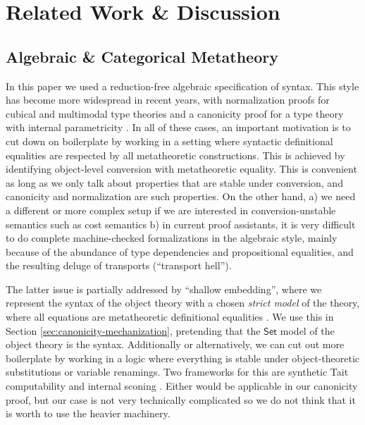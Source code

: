 \documentclass[acmsmall,screen,review]{acmart}
\newcommand{\msf}[1]{{\mathsf{#1}}}
\newcommand{\Set}{\msf{Set}}
\begin{document}
\section{Related Work \& Discussion}

\subsection{Algebraic \& Categorical Metatheory}

In this paper we used a reduction-free algebraic specification of syntax.  This style has become
more widespread in recent years, with normalization proofs for cubical \cite{ctt-normalization} and
multimodal type theories \cite{DBLP:conf/lics/Gratzer22} and a canonicity proof for a type theory
with internal parametricity \cite{altenkirch2024internal}. In all of these cases, an important
motivation is to cut down on boilerplate by working in a setting where syntactic definitional
equalities are respected by all metatheoretic constructions. This is achieved by identifying
object-level conversion with metatheoretic equality. This is convenient as long as we only talk
about properties that are stable under conversion, and canonicity and normalization are such
properties. On the other hand, a) we need a different or more complex setup if we are interested in
conversion-unstable semantics such as cost semantics b) in current proof assistants, it is very
difficult to do complete machine-checked formalizations in the algebraic style, mainly because of
the abundance of type dependencies and propositional equalities, and the resulting deluge of
transports (``transport hell'').

The latter issue is partially addressed by ``shallow embedding'', where we represent the syntax of
the object theory with a chosen \emph{strict model} of the theory, where all equations are
metatheoretic definitional equalities \cite{DBLP:conf/mpc/KaposiKK19}. We use this in Section
\ref{sec:canonicity-mechanization}, pretending that the $\Set$ model of the object theory is the
syntax. Additionally or alternatively, we can cut out more boilerplate by working in a logic where
everything is stable under object-theoretic substitutions or variable renamings. Two frameworks for
this are synthetic Tait computability \cite{sterlingthesis} and internal sconing
\cite{DBLP:conf/fscd/BocquetKS23}. Either would be applicable in our canonicity proof, but our case
is not very technically complicated so we do not think that it is worth to use the heavier machinery.
\end{document}
